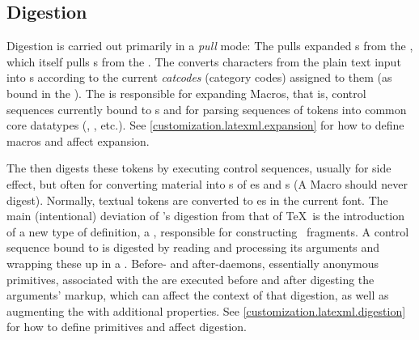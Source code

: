 \documentclass{book}
\begin{document}
\subsection{Digestion}\label{architecture.digestion}
%
%
%
%
%
%
%
%
%
%
%

Digestion is carried out primarily in a \emph{pull} mode: The 
pulls expanded s from the , which itself pulls s from 
the .  The  converts characters from the plain text input
into s according to the current \emph{catcodes} (category codes) assigned to
them (as bound in the ).  
The  is responsible for expanding Macros,
that is, control sequences currently bound to s
and for parsing sequences of tokens into common core datatypes
(, , etc.).
See \ref{customization.latexml.expansion} for how to define macros
and affect expansion.

The  then digests these tokens by executing  control 
sequences, usually for side effect, but often for converting material
into s of es and s
(A Macro should never digest).
Normally, textual tokens are converted to es in the current font.
The main (intentional) deviation of \LaTeXML's digestion from that of \TeX\ is
the introduction of a new type of definition, a ,
responsible for constructing \XML\ fragments.
A control sequence bound to  is digested by
reading and processing its arguments and wrapping these up in a .
Before- and after-daemons, essentially anonymous primitives, associated with
the  are executed before and after digesting the 
arguments' markup, which can affect the context of that digestion, as well
as augmenting the  with additional properties.
See \ref{customization.latexml.digestion} for how to define primitives
and affect digestion.
\end{document}
